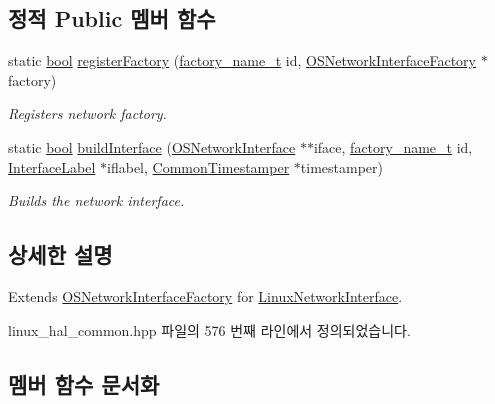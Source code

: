 \subsection*{정적 Public 멤버 함수}
\begin{DoxyCompactItemize}
\item 
static \hyperlink{avb__gptp_8h_af6a258d8f3ee5206d682d799316314b1}{bool} \hyperlink{class_o_s_network_interface_factory_a31c35b66fcf0061135c152be8e602acd}{register\+Factory} (\hyperlink{classfactory__name__t}{factory\+\_\+name\+\_\+t} id, \hyperlink{class_o_s_network_interface_factory}{O\+S\+Network\+Interface\+Factory} $\ast$factory)
\begin{DoxyCompactList}\small\item\em Registers network factory. \end{DoxyCompactList}\item 
static \hyperlink{avb__gptp_8h_af6a258d8f3ee5206d682d799316314b1}{bool} \hyperlink{class_o_s_network_interface_factory_a459ade6d7c1a3b8688bb8f982805077d}{build\+Interface} (\hyperlink{class_o_s_network_interface}{O\+S\+Network\+Interface} $\ast$$\ast$iface, \hyperlink{classfactory__name__t}{factory\+\_\+name\+\_\+t} id, \hyperlink{class_interface_label}{Interface\+Label} $\ast$iflabel, \hyperlink{class_common_timestamper}{Common\+Timestamper} $\ast$timestamper)
\begin{DoxyCompactList}\small\item\em Builds the network interface. \end{DoxyCompactList}\end{DoxyCompactItemize}


\subsection{상세한 설명}
Extends \hyperlink{class_o_s_network_interface_factory}{O\+S\+Network\+Interface\+Factory} for \hyperlink{class_linux_network_interface}{Linux\+Network\+Interface}. 

linux\+\_\+hal\+\_\+common.\+hpp 파일의 576 번째 라인에서 정의되었습니다.



\subsection{멤버 함수 문서화}
